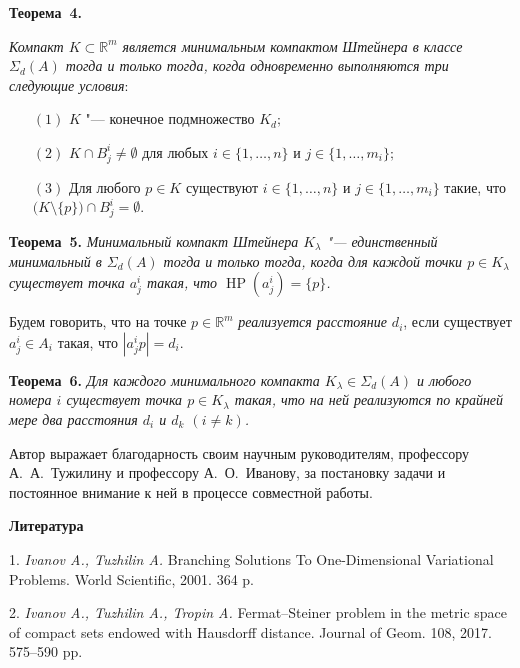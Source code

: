 \textbf{Теорема~4.} {\it Компакт $K \subset {\mathbb R^m}$ является минимальным компактом Штейнера в классе $\Sigma_d(A)$ тогда и только тогда, когда одновременно выполняются три следующие условия$:$
	\begin{itemize}
		\item[$(1)$] $K$ "--- конечное подмножество $K_d;$
		\item[$(2)$] $K\cap B_j^i\neq \emptyset$ для любых $i\in \{1,\ldots,n\}$ и $j\in \{1,\ldots,m_i\};$
		\item[$(3)$] Для любого $p \in K$ существуют $i\in \{1,\ldots,n\}$ и $j\in \{1,\ldots,m_i\}$ такие, что $\bigl(K\setminus \{p\}\bigr)\cap B_j^i=\emptyset$.
\end{itemize}}

\textbf{Теорема~5.} {\it Минимальный компакт Штейнера $K_\lambda$ "--- единственный минимальный в $\Sigma_d(A)$ тогда и только тогда, когда для каждой точки $p \in K_\lambda$ существует точка $a^i_j$ такая, что $\operatorname{HP}(a^i_j)=\{p\}$.}

Будем говорить, что на точке $p\in \mathbb R^m$ \emph{реализуется расстояние $d_i$}, если существует $a_j^i\in A_i$ такая, что $|a_j^ip|=d_i$.

\textbf{Теорема~6.} {\it Для каждого минимального компакта $K_\lambda \in \Sigma_d(A)$ и любого номера $i$ существует точка $p\in K_\lambda$ такая, что на ней реализуются по крайней мере два расстояния $d_i$ и $d_k$ $(i\neq k)$.}

Автор выражает благодарность своим научным руководителям, профессору А.~А.~Тужилину и профессору А.~О.~Иванову, за постановку задачи и постоянное внимание к ней в процессе совместной работы.



\smallskip \centerline {\bf Литература} \nopagebreak


1. {\it Ivanov A., Tuzhilin A.} Branching Solutions To One-Dimensional Variational Problems. World Scientific, 2001. 364 p.

2. {\it Ivanov A., Tuzhilin A., Tropin A.} Fermat–Steiner problem in the metric space of compact sets endowed with Hausdorff distance. Journal of Geom. 108, 2017. 575--590 pp.
